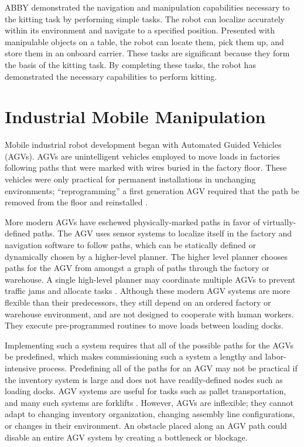 \documentclass[]{cwru} %
\begin{document}
ABBY demonstrated the navigation and manipulation capabilities necessary
to the kitting task by performing simple tasks. The robot can localize
accurately within its environment and navigate to a specified position.
Presented with manipulable objects on a table, the robot can locate
them, pick them up, and store them in an onboard carrier. These tasks
are significant because they form the basis of the kitting task. By
completing these tasks, the robot has demonstrated the necessary
capabilities to perform kitting.

\chapter{Industrial Mobile Manipulation}

Mobile industrial robot development began with Automated Guided Vehicles
(AGVs). AGVs are unintelligent vehicles employed to move loads in
factories following paths that were marked with wires buried in the
factory floor. These vehicles were only practical for permanent
installations in unchanging environments; ``reprogramming'' a first
generation AGV required that the path be removed from the floor and
reinstalled \cite{barbera}.

More modern AGVs have eschewed physically-marked paths in favor of
virtually-defined paths. The AGV uses sensor systems to localize itself
in the factory and navigation software to follow paths, which can be
statically defined or dynamically chosen by a higher-level planner. The
higher level planner chooses paths for the AGV from amongst a graph of
paths through the factory or warehouse. A single high-level planner may
coordinate multiple AGVs to prevent traffic jams and allocate tasks
\cite{vivaldini}. Although these modern AGV systems are more flexible than their
predecessors, they still depend on an ordered factory or warehouse
environment, and are not designed to cooperate with human workers. They
execute pre-programmed routines to move loads between loading docks.

Implementing such a system requires that all of the possible paths for
the AGVs be predefined, which makes commissioning such a system a
lengthy and labor-intensive process. Predefining all of the paths for an
AGV may not be practical if the inventory system is large and does not
have readily-defined nodes such as loading docks. AGV systems are useful
for tasks such as pallet transportation, and many such systems are
forklifts \cite{garibotto}. However, AGVs are inflexible; they cannot adapt to
changing inventory organization, changing assembly line configurations,
or changes in their environment. An obstacle placed along an AGV path
could disable an entire AGV system by creating a bottleneck or blockage.
\end{document}
